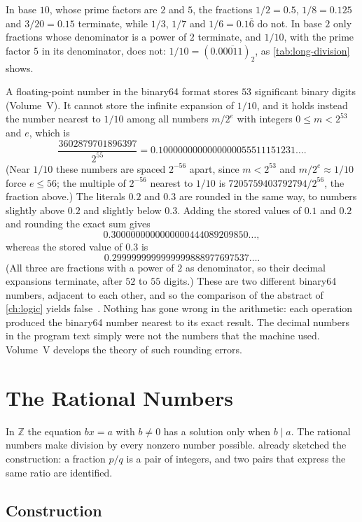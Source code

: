 In base $10$, whose prime factors are $2$ and $5$, the fractions $1/2=0.5$, $1/8=0.125$ and $3/20=0.15$ terminate, while $1/3$, $1/7$ and $1/6=0.1\overline6$ do not. In base $2$ only fractions whose denominator is a power of $2$ terminate, and $1/10$, with the prime factor $5$ in its denominator, does not: $1/10=(0.0\overline{0011})_2$, as \cref{tab:long-division} shows.

A floating-point number in the binary64 format stores $53$ significant binary digits (Volume~V). It cannot store the infinite expansion of $1/10$, and it holds instead the number nearest to $1/10$ among all numbers $m/2^e$ with integers $0\le m<2^{53}$ and $e$, which is
\[
\frac{3602879701896397}{2^{55}}=0.1000000000000000055511151231\ldots.
\]
(Near $1/10$ these numbers are spaced $2^{-56}$ apart, since $m<2^{53}$ and $m/2^e\approx1/10$ force $e\le56$; the multiple of $2^{-56}$ nearest to $1/10$ is $7205759403792794/2^{56}$, the fraction above.) The literals $0.2$ and $0.3$ are rounded in the same way, to numbers slightly above $0.2$ and slightly below $0.3$. Adding the stored values of $0.1$ and $0.2$ and rounding the exact sum gives
\[
0.3000000000000000444089209850\ldots,
\]
whereas the stored value of $0.3$ is
\[
0.2999999999999999888977697537\ldots.
\]
(All three are fractions with a power of $2$ as denominator, so their decimal expansions terminate, after $52$ to $55$ digits.) These are two different binary64 numbers, adjacent to each other, and so the comparison  of the abstract of \cref{ch:logic} yields false~\cite{goldberg1991,ieee754-2019}. Nothing has gone wrong in the arithmetic: each operation produced the binary64 number nearest to its exact result. The decimal numbers in the program text simply were not the numbers that the machine used. Volume~V develops the theory of such rounding errors.

\section{The Rational Numbers}
\label{sec:rationals}

In $\mathbb Z$ the equation $bx=a$ with $b\ne0$ has a solution only when $b\mid a$. The rational numbers make division by every nonzero number possible.  already sketched the construction: a fraction $p/q$ is a pair of integers, and two pairs that express the same ratio are identified.

\subsection{Construction}

